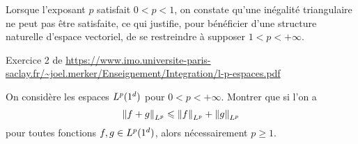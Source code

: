 Lorsque l’exposant $p$ satisfait $0 < p < 1$, on constate qu’une inégalité triangulaire ne peut pas être satisfaite, ce qui justifie, pour bénéficier d’une structure naturelle
d’espace vectoriel, de se restreindre à supposer $1 < p < +\infty$. 

Exercice 2 de \url{https://www.imo.universite-paris-saclay.fr/~joel.merker/Enseignement/Integration/l-p-espaces.pdf}
\begin{exercice}
    On considère les espaces $L^p(1^d)$ pour  $0 < p < +\infty$. Montrer que si l'on a 
    \[
    \norm{f + g}_{L^p} \leqslant  \norm{f}_{L^p} + \norm{g}_{L^p}
    \]
    pour toutes fonctions $f, g \in L^p(1^d )$, alors nécessairement $p \geqslant 1$.
\end{exercice}
